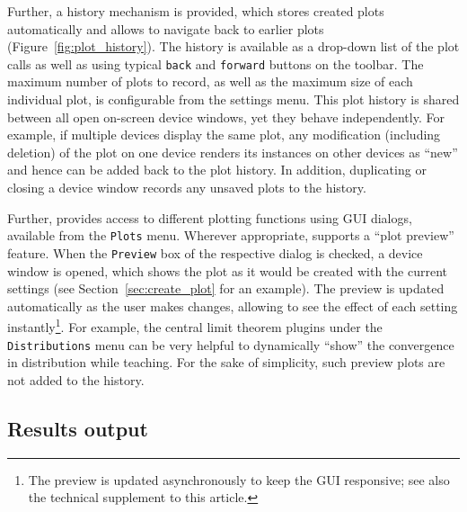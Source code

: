 Further, a history mechanism is provided,
which stores created plots automatically and allows to navigate
back to earlier plots (Figure~\ref{fig:plot_history}). 
The history is available as a drop-down list of the plot calls as well as using typical \texttt{back}
and \texttt{forward} buttons on the toolbar.
The maximum number
of plots to record, as well as the maximum size of each individual plot,
is configurable from the settings menu. This plot history is shared
between all open on{}-screen device windows, yet they behave
independently. For example, if multiple devices display the same
plot, any modification (including deletion) of the plot on one device
renders its instances on other devices as ``new'' and hence can be added
back to the plot history. In addition, duplicating or closing a device
window records any unsaved plots to the history.

Further,  provides access to different plotting functions using GUI dialogs,
available from the \texttt{Plots} menu. Wherever appropriate,  supports a ``plot
preview'' feature. When the \texttt{Preview} box of
the respective dialog is checked, a device window is opened, which
shows the plot as it would be created with the current settings (see Section~\ref{sec:create_plot} for an example). The
preview is updated automatically as the user makes changes, allowing to
see the effect of each setting instantly\footnote{The preview is
updated asynchronously to keep the GUI responsive; see also the technical supplement to this article.}. For example, the
central limit theorem plugins
under the \texttt{Distributions} menu can be very helpful to dynamically ``show''
the convergence in distribution while teaching. For the sake of simplicity, such preview plots are not added to
the history.

\subsection{Results output}
\label{sec:results_output}

